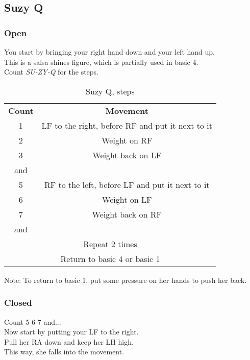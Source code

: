 \subsection{Suzy Q}
\subsubsection{Open}
You start by bringing your right hand down and your left hand up.\\
This is a salsa shines figure, which is partially used in basic 4.\\
Count \textit{SU-ZY-Q} for the steps.\\
\begin{table}[H]
\centering
\begin{tabular}{cc}
  \toprule
  \textbf{Count} & \textbf{Movement}\\
  \cmidrule(lr){1-1}\cmidrule(lr){2-2}
  1 & LF to the right, before RF and put it next to it\\
  2 & Weight on RF\\
  3 & Weight back on LF\\
  and & \\
  5 & RF to the left, before LF and put it next to it\\
  6 & Weight on LF\\
  7 & Weight back on RF\\
  and & \\
  \multicolumn{2}{c}{Repeat 2 times}\\
  \multicolumn{2}{c}{Return to basic 4 or basic 1}\\
  \bottomrule
\end{tabular}
\label{suzyq_steps}
\caption{Suzy Q, steps}
\end{table}

Note: To return to basic 1, put some pressure on her hands to push her back.

\subsubsection{Closed}
Count 5 6 7 and...\\
Now start by putting your LF to the right.\\
Pull her RA down and keep her LH high.\\
This way, she falls into the movement.

